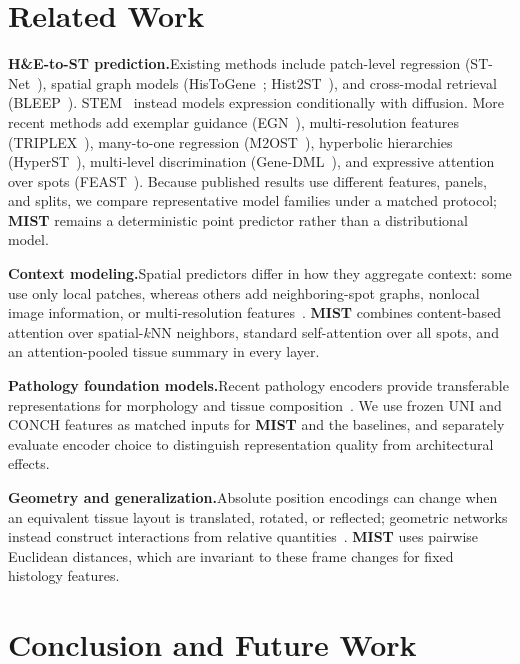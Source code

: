 \documentclass[11pt]{article}
\newcommand{\morph}{\textbf{MIST}}
\begin{document}
\section{Related Work}
\noindent\textbf{H\&E-to-ST prediction.}\quad Existing methods include patch-level regression
(ST-Net~\cite{he2020stnet}), spatial graph models (HisToGene~\cite{pang2021histogene};
Hist2ST~\cite{zeng2022hist2st}), and cross-modal retrieval (BLEEP~\cite{xie2023bleep}). STEM~\cite{zhu2025diffusion} instead models expression
conditionally with diffusion. More recent methods add exemplar guidance (EGN~\cite{yang2023egn}),
multi-resolution features (TRIPLEX~\cite{chung2024triplex}), many-to-one regression
(M2OST~\cite{wang2025m2ost}), hyperbolic hierarchies (HyperST~\cite{zhang2026hyperst}),
multi-level discrimination (Gene-DML~\cite{song2026genedml}), and expressive attention over spots
(FEAST~\cite{jeong2026feast}). Because published results use different features, panels, and splits,
we compare representative model families under a matched protocol; \morph{} remains a deterministic point
predictor rather than a distributional model.

\noindent\textbf{Context modeling.}\quad Spatial predictors differ in how they aggregate context:
some use only local patches, whereas others add neighboring-spot graphs, nonlocal image information,
or multi-resolution features~\cite{chung2024triplex}. \morph{} combines content-based attention over spatial-$k$NN neighbors,
standard self-attention over all spots, and an attention-pooled tissue summary in every layer.

\noindent\textbf{Pathology foundation models.}\quad Recent pathology encoders provide transferable
representations for morphology and tissue composition~\cite{chen2024uni,lu2024conch}. We use frozen
UNI and CONCH features as matched inputs for \morph{} and the baselines, and separately evaluate
encoder choice to distinguish representation quality from architectural effects.

\noindent\textbf{Geometry and generalization.}\quad Absolute position encodings can change when an
equivalent tissue layout is translated, rotated, or reflected; geometric networks instead construct
interactions from relative quantities~\cite{satorras2021egnn}. \morph{} uses pairwise Euclidean
distances, which are invariant to these frame changes for fixed histology features.

\section{Conclusion and Future Work}
\end{document}
